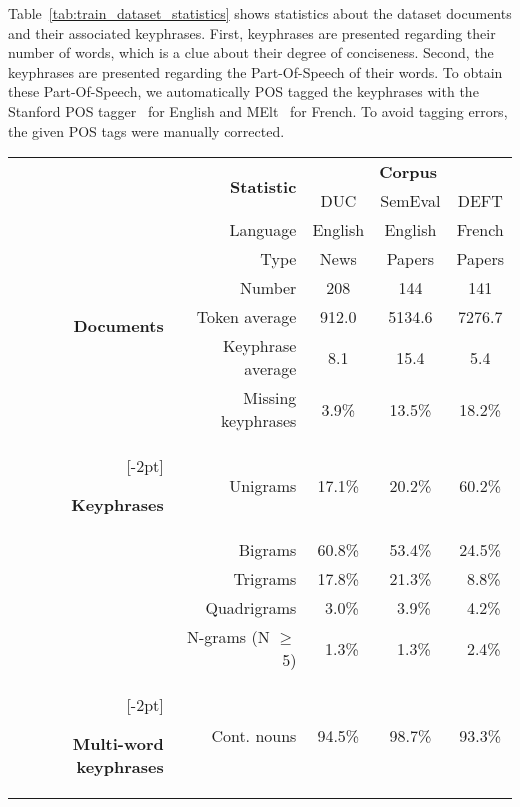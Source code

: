     Table~\ref{tab:train_dataset_statistics} shows statistics about the dataset
    documents and their associated keyphrases. First, keyphrases are presented
    regarding their number of words, which is a clue about their degree of
    conciseness. Second, the keyphrases are presented regarding the
    Part-Of-Speech of their words. To obtain these Part-Of-Speech, we
    automatically POS tagged the keyphrases with the Stanford POS
    tagger~\cite{toutanova2003stanfordpostagger} for English and
    MElt~\cite{denis2009melt} for French. To avoid tagging errors, the given POS
    tags were manually corrected.
    \begin{table}[h]
      \centering
      \begin{tabular}{@{~}r@{~}r@{~}c@{~}c@{~}c@{~}}
        \toprule
        & \multirow{2}{*}[-2pt]{\textbf{Statistic}} & \multicolumn{3}{c}{\textbf{Corpus}}\\
        \cmidrule{3-5}
        & & DUC & SemEval & DEFT\\
        \midrule
        \multirow{6}{*}[-2pt]{\begin{sideways}\textbf{Documents}\end{sideways}} & Language & English & English & French\\
        & Type & News & Papers & Papers\\
        & Number & 208 & 144 & 141\\
        & Token average & 912.0 & 5134.6 & 7276.7\\
        & Keyphrase average & 8.1 & 15.4 & 5.4\\
        & Missing keyphrases & 3.9\% & 13.5\% & 18.2\%\\
        \addlinespace[1.5\defaultaddspace]
        \multirow{5}{*}[-2pt]{\begin{sideways}\textbf{Keyphrases}\end{sideways}} & Unigrams & 17.1\% & 20.2\% & 60.2\%\\
        & Bigrams & 60.8\% & 53.4\% & 24.5\%\\
        & Trigrams & 17.8\% & 21.3\% & $~~$8.8\%\\
        & Quadrigrams & $~~$3.0\% & $~~$3.9\% & $~~$4.2\%\\
        & N-grams (N $\geq$ 5) & $~~$1.3\% & $~~$1.3\% & $~~$2.4\%\\
        \addlinespace[1.5\defaultaddspace]
        \multirow{5}{*}[-2pt]{\begin{sideways}\textbf{Multi-word keyphrases}\end{sideways}} & Cont. nouns & 94.5\% & 98.7\% & 93.3\%\\

\end{tabular}
\end{table}
